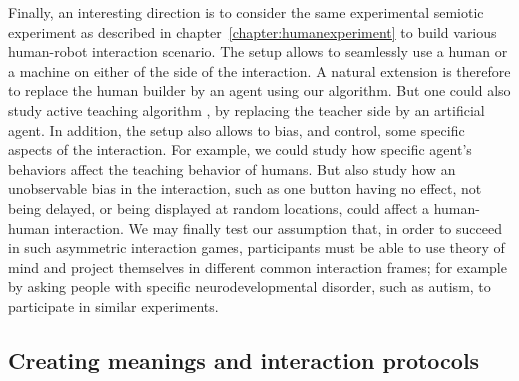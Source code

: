 Finally, an interesting direction is to consider the same experimental semiotic experiment as described in chapter~\ref{chapter:humanexperiment} to build various human-robot interaction scenario. The setup allows to seamlessly use a human or a machine on either of the side of the interaction. A natural extension is therefore to replace the human builder by an agent using our algorithm. But one could also study active teaching algorithm \cite{cakmak2012algorithmic}, by replacing the teacher side by an artificial agent. In addition, the setup also allows to bias, and control, some specific aspects of the interaction. For example, we could study how specific agent's behaviors affect the teaching behavior of humans. But also study how an unobservable bias in the  interaction, such as one button having no effect, not being delayed, or being displayed at random locations, could affect a human-human interaction. We may finally test our assumption that, in order to succeed in such asymmetric interaction games, participants must be able to use theory of mind and project themselves in different common interaction frames; for example by asking people with specific neurodevelopmental disorder, such as autism, to participate in similar experiments.





\subsection*{Creating meanings and interaction protocols}



